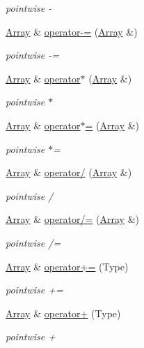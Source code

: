 \begin{DoxyCompactItemize}
\begin{DoxyCompactList}\small\item\em pointwise -\/ \end{DoxyCompactList}\item 
\hyperlink{classArray}{Array} \& \hyperlink{classArray_a60b31bebcb2ea8e4e8c70da979fbe48e}{operator-\/=} (\hyperlink{classArray}{Array} \&)
\begin{DoxyCompactList}\small\item\em pointwise -\/= \end{DoxyCompactList}\item 
\hyperlink{classArray}{Array} \& \hyperlink{classArray_a3a8a0359626414c9e53d897d33ca4e0d}{operator$\ast$} (\hyperlink{classArray}{Array} \&)
\begin{DoxyCompactList}\small\item\em pointwise $\ast$ \end{DoxyCompactList}\item 
\hyperlink{classArray}{Array} \& \hyperlink{classArray_aa63e2841203811594d9f3f9bc086c8b2}{operator$\ast$=} (\hyperlink{classArray}{Array} \&)
\begin{DoxyCompactList}\small\item\em pointwise $\ast$= \end{DoxyCompactList}\item 
\hyperlink{classArray}{Array} \& \hyperlink{classArray_a39139dd796db274a9da2864e784d3117}{operator/} (\hyperlink{classArray}{Array} \&)
\begin{DoxyCompactList}\small\item\em pointwise / \end{DoxyCompactList}\item 
\hyperlink{classArray}{Array} \& \hyperlink{classArray_a35dacf0d8b2138970462d772e2bd65a6}{operator/=} (\hyperlink{classArray}{Array} \&)
\begin{DoxyCompactList}\small\item\em pointwise /= \end{DoxyCompactList}\item 
\hyperlink{classArray}{Array} \& \hyperlink{classArray_afbbf77d0248e4169e4156f00805374e1}{operator+=} (Type)
\begin{DoxyCompactList}\small\item\em pointwise += \end{DoxyCompactList}\item 
\hyperlink{classArray}{Array} \& \hyperlink{classArray_aecba86a93bde548784c4e8c4e16d5790}{operator+} (Type)
\begin{DoxyCompactList}\small\item\em pointwise + \end{DoxyCompactList}\item 

\end{DoxyCompactItemize}
